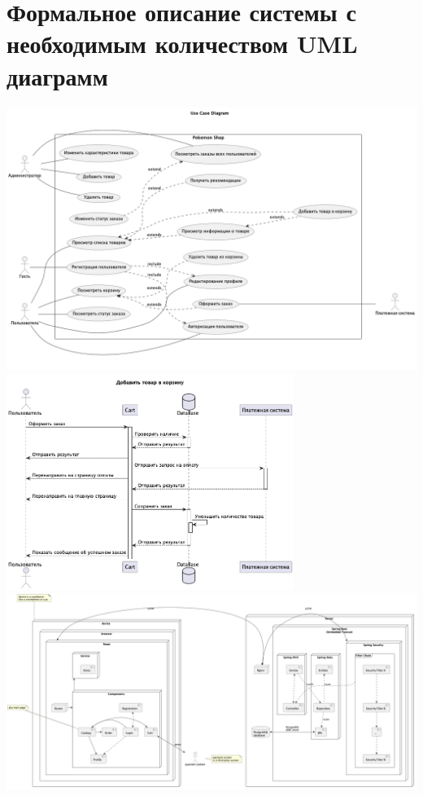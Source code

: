 \documentclass[12pt,onecolumn]{article}
\begin{document}
\section{Формальное описание системы с необходимым количеством UML диаграмм}
\includegraphics[width=\textwidth]{image/usecase.png}\\
\includegraphics[width=0.7\textwidth]{image/sequence.png}\\
\includegraphics[width=\textwidth]{../out/Lab1/component/component_diagram.png}\\
\end{document}
